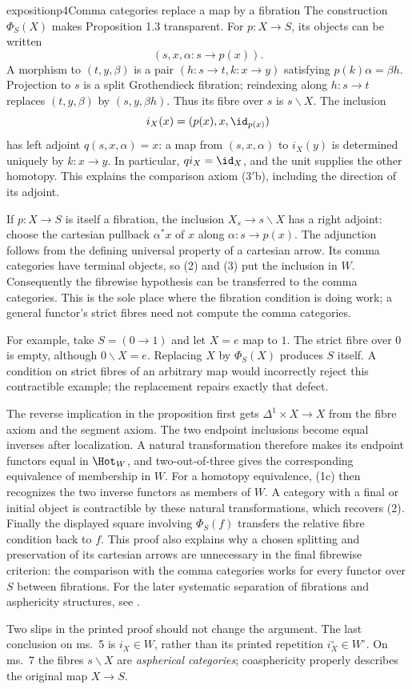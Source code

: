 \begin{dcomment}{exposition}{p4}{Comma categories replace a map by a fibration}
The construction $\Phi_S(X)$ makes Proposition 1.3 transparent. For $p:X\to S$, its objects can be written
\[
(s,x,\alpha:s\longrightarrow p(x)).
\]
A morphism to $(t,y,\beta)$ is a pair $(h:s\to t,k:x\to y)$ satisfying $p(k)\alpha=\beta h$. Projection to $s$ is a split Grothendieck fibration; reindexing along $h:s\to t$ replaces $(t,y,\beta)$ by $(s,y,\beta h)$. Thus its fibre over $s$ is $s\backslash X$. The inclusion
\[
i_X(x)=(p(x),x,\id_{p(x)})
\]
has left adjoint $q(s,x,\alpha)=x$: a map from $(s,x,\alpha)$ to $i_X(y)$ is determined uniquely by $k:x\to y$. In particular, $qi_X=\id_X$, and the unit supplies the other homotopy. This explains the comparison axiom (3$'$b), including the direction of its adjoint.

If $p:X\to S$ is itself a fibration, the inclusion $X_s\to s\backslash X$ has a right adjoint: choose the cartesian pullback $\alpha^*x$ of $x$ along $\alpha:s\to p(x)$. The adjunction follows from the defining universal property of a cartesian arrow. Its comma categories have terminal objects, so (2) and (3) put the inclusion in $W$. Consequently the fibrewise hypothesis can be transferred to the comma categories. This is the sole place where the fibration condition is doing work; a general functor's strict fibres need not compute the comma categories.

For example, take $S=(0\to1)$ and let $X=e$ map to $1$. The strict fibre over $0$ is empty, although $0\backslash X=e$. Replacing $X$ by $\Phi_S(X)$ produces $S$ itself. A condition on strict fibres of an arbitrary map would incorrectly reject this contractible example; the replacement repairs exactly that defect.

The reverse implication in the proposition first gets $\Delta^1\times X\to X$ from the fibre axiom and the segment axiom. The two endpoint inclusions become equal inverses after localization. A natural transformation therefore makes its endpoint functors equal in $\Hot_W$, and two-out-of-three gives the corresponding equivalence of membership in $W$. For a homotopy equivalence, (1c) then recognizes the two inverse functors as members of $W$. A category with a final or initial object is contractible by these natural transformations, which recovers (2). Finally the displayed square involving $\Phi_S(f)$ transfers the relative fibre condition back to $f$. This proof also explains why a chosen splitting and preservation of its cartesian arrows are unnecessary in the final fibrewise criterion: the comparison with the comma categories works for every functor over $S$ between fibrations. For the later systematic separation of fibrations and asphericity structures, see \citet[\S1]{Maltsiniotis2005Asphericite}.

Two slips in the printed proof should not change the argument. The last conclusion on ms.~5 is $i_X\in W$, rather than its printed repetition $i_X^\circ\in W^\circ$. On ms.~7 the fibres $s\backslash X$ are \emph{aspherical categories}; coasphericity properly describes the original map $X\to S$.
\end{dcomment}

